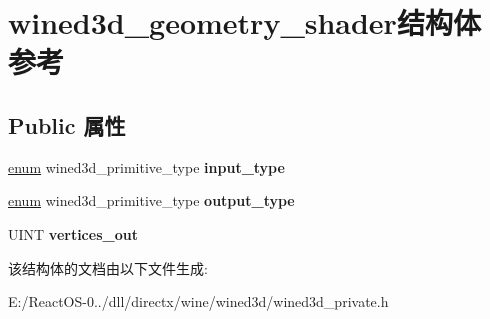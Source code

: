 \hypertarget{structwined3d__geometry__shader}{}\section{wined3d\+\_\+geometry\+\_\+shader结构体 参考}
\label{structwined3d__geometry__shader}
\subsection*{Public 属性}
\begin{DoxyCompactItemize}
\item 
\mbox{\label{structwined3d__geometry__shader_afd12de61681edfdf8be629b982f60628}} 
\hyperlink{interfaceenum}{enum} wined3d\+\_\+primitive\+\_\+type {\bfseries input\+\_\+type}
\item 
\mbox{\label{structwined3d__geometry__shader_a5a6f716d6dc6638a37aa9736730eb57d}} 
\hyperlink{interfaceenum}{enum} wined3d\+\_\+primitive\+\_\+type {\bfseries output\+\_\+type}
\item 
\mbox{\label{structwined3d__geometry__shader_a639d4416c7c670f58a8a6813c632b0bf}} 
U\+I\+NT {\bfseries vertices\+\_\+out}
\end{DoxyCompactItemize}


该结构体的文档由以下文件生成\+:\begin{DoxyCompactItemize}
\item 
E\+:/\+React\+O\+S-\/0../dll/directx/wine/wined3d/wined3d\+\_\+private.\+h\end{DoxyCompactItemize}
